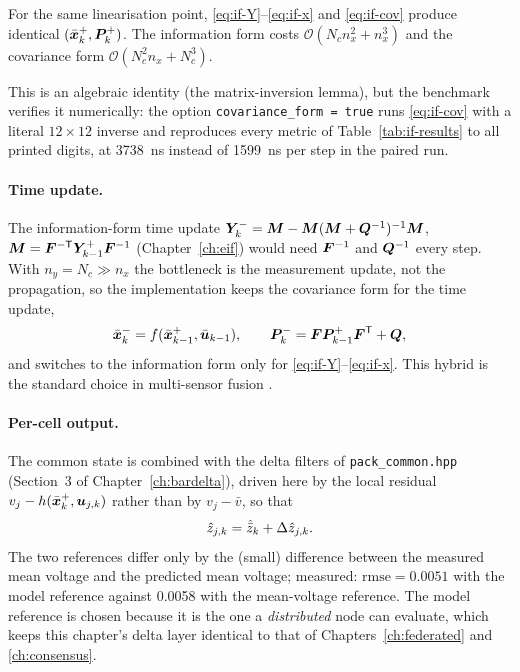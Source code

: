 \begin{proposition}\label{prop:if-equiv}
For the same linearisation point, \eqref{eq:if-Y}--\eqref{eq:if-x} and \eqref{eq:if-cov} produce
identical $(\bar{\bm{x}}^+_k,\bm{P}^{+}_k)$. The information form costs
$\mathcal{O}(N_c n_x^2 + n_x^3)$ and the covariance form $\mathcal{O}(N_c^2 n_x + N_c^3)$.
\end{proposition}
This is an algebraic identity (the matrix-inversion lemma), but the benchmark verifies it
numerically: the option \texttt{covariance\_form = true} runs \eqref{eq:if-cov} with a literal
$12\times12$ inverse and reproduces every metric of Table~\ref{tab:if-results} to all printed
digits, at \SI{3738}{\nano\second} instead of \SI{1599}{\nano\second} per step in the paired run.

\paragraph{Time update.} The information-form time update
$\bm{Y}^-_k = \bm{M}-\bm{M}(\bm{M}+\bm{Q}^{-1})^{-1}\bm{M}$, $\bm{M}=\bm{F}^{-\mathsf{T}}\bm{Y}^+_{k-1}\bm{F}^{-1}$
(Chapter~\ref{ch:eif}) would need $\bm{F}^{-1}$ and $\bm{Q}^{-1}$ every step. With $n_y=N_c\gg n_x$ the
bottleneck is the measurement update, not the propagation, so the implementation keeps the
covariance form for the time update,
\begin{equation}
\bar{\bm{x}}^-_k = f(\bar{\bm{x}}^+_{k-1},\bar{\bm{u}}_{k-1}),\qquad
\bm{P}^{-}_k = \bm{F}\bm{P}^{+}_{k-1}\bm{F}^{\mathsf{T}} + \bm{Q},
\label{eq:if-tu}
\end{equation}
and switches to the information form only for \eqref{eq:if-Y}--\eqref{eq:if-x}. This hybrid is
the standard choice in multi-sensor fusion \cite[\S4]{mutambara1998}.

\paragraph{Per-cell output.} The common state is combined with the delta filters of
\texttt{pack\_common.hpp} (Section~3 of Chapter~\ref{ch:bardelta}), driven here by the local
residual $v_j - h(\bar{\bm{x}}^+_k,\bm{u}_{j,k})$ rather than by $v_j-\bar v$, so that
\begin{equation}
\hat{z}_{j,k} = \hat{\bar{z}}_k + \Delta\hat{z}_{j,k}.
\label{eq:if-out}
\end{equation}
The two references differ only by the (small) difference between the measured mean voltage and the
predicted mean voltage; measured: $\text{rmse}=\num{0.0051}$ with the model reference against
\num{0.0058} with the mean-voltage reference. The model reference is chosen because it is the one
a \emph{distributed} node can evaluate, which keeps this chapter's delta layer identical to that
of Chapters~\ref{ch:federated} and \ref{ch:consensus}.

